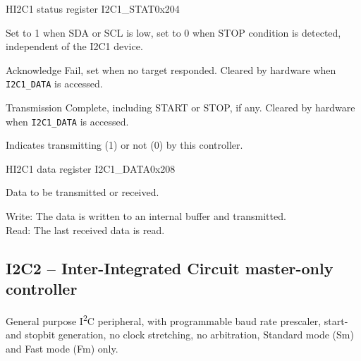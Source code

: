 \documentclass[12pt]{article}
\begin{document}
\begin{register}{H}{I2C1 status register I2C1\_STAT}{0x204}
\label{i2c1stat}
%
%
%
%
%
%
\regnewline%
\end{register}
\begin{regdesc}[0.8\textwidth]\begin{reglist}[0000000]
\item [BUSY] Set to 1 when SDA or SCL is low, set to 0 when STOP condition is detected, independent of the I2C1 device.
\item [AF] Acknowledge Fail, set when no target responded. Cleared by hardware when \lstinline|I2C1_DATA| is accessed.
\item [TC] Transmission Complete, including START or STOP, if any. Cleared by hardware when \lstinline|I2C1_DATA| is accessed.
\item [TRANS] Indicates transmitting (1) or not (0) by this controller.
\end{reglist}\end{regdesc}

\begin{register}{H}{I2C1 data register I2C1\_DATA}{0x208}
\label{i2c11data}
%
\regnewline%
\end{register}
\begin{regdesc}[0.8\textwidth]\begin{reglist}[000000000]
\item [DATA] Data to be transmitted or received.
\end{reglist}\end{regdesc}
Write: The data is written to an internal buffer and transmitted.\\
Read: The last received data is read.


\subsection{I2C2 -- Inter-Integrated Circuit master-only controller}
General purpose I\textsuperscript{2}C peripheral, with programmable baud rate prescaler, start- and stopbit generation, no clock stretching, no arbitration, Standard mode (Sm) and Fast mode (Fm) only.
\end{document}
